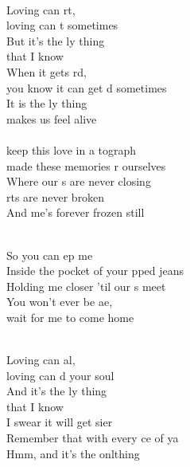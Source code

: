 \begin{cancion}[Photograph][Ed Sheeran]%
	    \\
	Loving can rt, \\
	loving can t sometimes\\
	But it's the ly thing \\
	that I know  \\
	When it gets rd, \\
	you know it can get d sometimes\\
	It is the ly thing \\
	makes us feel alive\\
\jump\\
	keep this love in a tograph\\
	 made these memories r ourselves\\
	Where our s are never closing\\
	rts are never broken\\
	And me's forever frozen still\\\jump\\
	\begin{chorus}%
	So you can ep me\\
	Inside the pocket of your pped jeans\\
	Holding me closer 'til our s meet\\
	You won't ever be ae, \\
	wait for me to come home \\
	\end{chorus}%
	\jump\\
	Loving can al, \\
	loving can d your soul\\
	And it's the ly thing \\
	that I know \\
	I swear it will get sier\\
	Remember that with every ce of ya\\
	Hmm, and it's the onlthing \\

\end{cancion}
